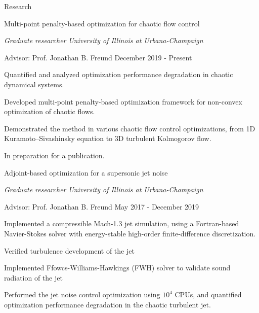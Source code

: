 \documentclass{resume} %
\begin{document}
\begin{rSection}{Research}
\begin{rSubsection}{Multi-point penalty-based optimization for chaotic flow control}{}{}{}
\item[] \textit{Graduate researcher} \hfill \textit{University of Illinois at Urbana-Champaign}
\item[] Advisor: Prof. Jonathan B. Freund \hfill December 2019 - Present
\item Quantified and analyzed optimization performance degradation in chaotic dynamical systems.
\item Developed multi-point penalty-based optimization framework for non-convex optimization of chaotic flows.
\item Demonstrated the method in various chaotic flow control optimizations,
from 1D Kuramoto--Sivashinsky equation to 3D turbulent Kolmogorov flow.
\item In preparation for a publication.
\end{rSubsection}

\begin{rSubsection}{Adjoint-based optimization for a supersonic jet noise}{}{}{}
\item[] \textit{Graduate researcher} \hfill \textit{University of Illinois at Urbana-Champaign}
\item[] Advisor: Prof. Jonathan B. Freund \hfill May 2017 - December 2019
\item Implemented a compressible Mach-1.3 jet simulation,
using a Fortran-based Navier-Stokes solver with energy-stable high-order finite-difference discretization.
\item Verified turbulence development of the jet
\item Implemented Ffowcs-Williams-Hawkings (FWH) solver to validate sound radiation of the jet
\item Performed the jet noise control optimization using $10^4$ CPUs, and quantified optimization performance degradation in the chaotic turbulent jet.
\end{rSubsection}


\end{rSection}
\end{document}
